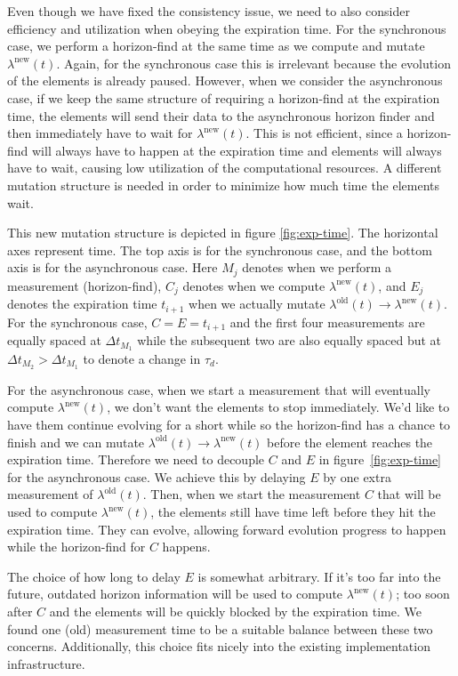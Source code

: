 \begin{bibunit}[unsrtnat]
Even though we have fixed the consistency issue, we need to also consider
efficiency and utilization when obeying the expiration time. For the synchronous
case, we perform a horizon-find at the same time as we compute and mutate
$\lambda^\mathrm{new}(t)$. Again, for the synchronous case this is irrelevant
because the evolution of the elements is already paused. However, when we
consider the asynchronous case, if we keep the same structure of requiring a
horizon-find at the expiration time, the elements will send their data to the
asynchronous horizon finder and then immediately have to wait for
$\lambda^\mathrm{new}(t)$. This is not efficient, since a horizon-find will
always have to happen at the expiration time and elements will always have to
wait, causing low utilization of the computational resources. A different
mutation structure is needed in order to minimize how much time the elements
wait.

This new mutation structure is depicted in figure \ref{fig:exp-time}. The
horizontal axes represent time. The top axis is for the synchronous case, and
the bottom axis is for the asynchronous case. Here $M_j$ denotes when we perform
a measurement (horizon-find), $C_j$ denotes when we compute
$\lambda^\mathrm{new}(t)$, and $E_j$ denotes the expiration time $t_{i+1}$ when
we actually mutate $\lambda^\mathrm{old}(t)\rightarrow\lambda^\mathrm{new}(t)$.
For the synchronous case, $C=E=t_{i+1}$ and the first four measurements are
equally spaced at $\Delta t_{M_1}$ while the subsequent two are also equally
spaced but at $\Delta t_{M_2} > \Delta t_{M_1}$ to denote a change in $\tau_d$.

For the asynchronous case, when we start a measurement that will eventually
compute $\lambda^\mathrm{new}(t)$, we don't want the elements to stop
immediately. We'd like to have them continue evolving for a short while so the
horizon-find has a chance to finish and we can mutate
$\lambda^\mathrm{old}(t)\rightarrow\lambda^\mathrm{new}(t)$ before the element
reaches the expiration time. Therefore we need to decouple $C$ and $E$ in
figure~\ref{fig:exp-time} for the asynchronous case.
We achieve this by delaying $E$ by
one extra measurement of $\lambda^\mathrm{old}(t)$. Then, when we start the
measurement $C$ that will be used to compute $\lambda^\mathrm{new}(t)$, the
elements still have time left before they hit the expiration time.
They can evolve, allowing forward evolution progress to happen while
the horizon-find for $C$ happens.

The choice of how long to delay $E$ is somewhat arbitrary. If it's too far into
the future, outdated horizon information will be used to compute
$\lambda^\mathrm{new}(t)$; too soon after $C$ and the elements will be quickly
blocked by the expiration time. We found one (old) measurement time to be a
suitable balance between these two concerns. Additionally, this choice fits
nicely into the existing implementation infrastructure.


\end{bibunit}
